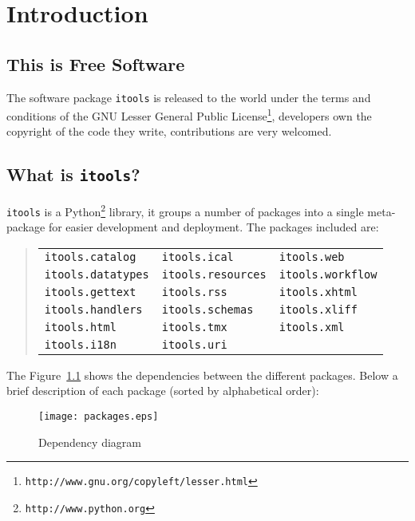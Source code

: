 \chapter{Introduction}

\section{This is Free Software}

The software package {\tt itools} is released to the world under the terms
and conditions of the GNU Lesser General Public
License\footnote{\tt http://www.gnu.org/copyleft/lesser.html}, developers
own the copyright of the code they write, contributions are very welcomed.

\section{What is {\tt itools}?}

{\tt itools} is a Python\footnote{\tt http://www.python.org} library, it
groups a number of packages into a single meta-package for easier
development and deployment. The packages included are:

\begin{quote}
\begin{tabular}{lll}
  {\tt itools.catalog} & {\tt itools.ical} & {\tt itools.web} \\
  {\tt itools.datatypes} & {\tt itools.resources} & {\tt itools.workflow} \\
  {\tt itools.gettext} & {\tt itools.rss} & {\tt itools.xhtml} \\
  {\tt itools.handlers} & {\tt itools.schemas} & {\tt itools.xliff} \\
  {\tt itools.html} & {\tt itools.tmx} & {\tt itools.xml} \\
  {\tt itools.i18n} & {\tt itools.uri} & \\
\end{tabular}
\end{quote}

The Figure~\ref{Figure: packages} shows the dependencies between the
different packages. Below a brief description of each package (sorted
by alphabetical order):

\begin{figure}
  \center
  \texttt{[image: packages.eps]}
  \caption{Dependency diagram}
  \label{Figure: packages}
\end{figure}

